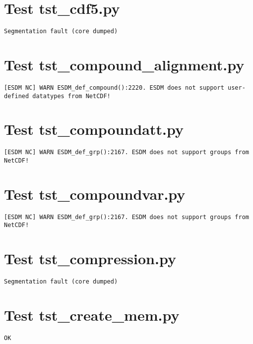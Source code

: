 \section{Test tst\_cdf5.py}

\begin{verbatim}
Segmentation fault (core dumped)
\end{verbatim}

\section{Test tst\_compound\_alignment.py}

\begin{verbatim}
[ESDM NC] WARN ESDM_def_compound():2220. ESDM does not support user-defined datatypes from NetCDF!
\end{verbatim}

\section{Test tst\_compoundatt.py}

\begin{verbatim}
[ESDM NC] WARN ESDM_def_grp():2167. ESDM does not support groups from NetCDF!
\end{verbatim}

\section{Test tst\_compoundvar.py}

\begin{verbatim}
[ESDM NC] WARN ESDM_def_grp():2167. ESDM does not support groups from NetCDF!
\end{verbatim}

\section{Test tst\_compression.py}

\begin{verbatim}
Segmentation fault (core dumped)
\end{verbatim}

\section{Test tst\_create\_mem.py}

\begin{verbatim}
OK
\end{verbatim}

